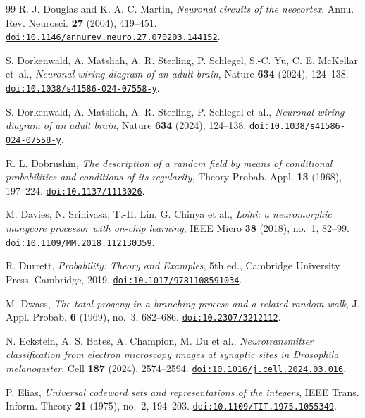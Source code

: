 \begin{thebibliography}{99}
R. J. Douglas and K. A. C. Martin,
\emph{Neuronal circuits of the neocortex},
Annu. Rev. Neurosci. \textbf{27} (2004), 419--451.
\href{https://doi.org/10.1146/annurev.neuro.27.070203.144152}{\nolinkurl{doi:10.1146/annurev.neuro.27.070203.144152}}.

S. Dorkenwald, A. Matsliah, A. R. Sterling, P. Schlegel, S.-C. Yu, C. E. McKellar et~al.,
\emph{Neuronal wiring diagram of an adult brain},
Nature \textbf{634} (2024), 124--138.
\href{https://doi.org/10.1038/s41586-024-07558-y}{\nolinkurl{doi:10.1038/s41586-024-07558-y}}.

S. Dorkenwald, A. Matsliah, A. R. Sterling, P. Schlegel et al.,
\emph{Neuronal wiring diagram of an adult brain},
Nature \textbf{634} (2024), 124--138.
\href{https://doi.org/10.1038/s41586-024-07558-y}{\nolinkurl{doi:10.1038/s41586-024-07558-y}}.

R. L. Dobrushin,
\emph{The description of a random field by means of conditional probabilities and conditions of its regularity},
Theory Probab. Appl. \textbf{13} (1968), 197--224.
\href{https://doi.org/10.1137/1113026}{\nolinkurl{doi:10.1137/1113026}}.

M. Davies, N. Srinivasa, T.-H. Lin, G. Chinya et al.,
\emph{Loihi: a neuromorphic manycore processor with on-chip learning},
IEEE Micro \textbf{38} (2018), no.~1, 82--99.
\href{https://doi.org/10.1109/MM.2018.112130359}{\nolinkurl{doi:10.1109/MM.2018.112130359}}.

R. Durrett,
\emph{Probability: Theory and Examples}, 5th ed.,
Cambridge University Press, Cambridge, 2019.
\href{https://doi.org/10.1017/9781108591034}{\nolinkurl{doi:10.1017/9781108591034}}.

M. Dwass,
\emph{The total progeny in a branching process and a related random walk},
J. Appl. Probab. \textbf{6} (1969), no.~3, 682--686.
\href{https://doi.org/10.2307/3212112}{\nolinkurl{doi:10.2307/3212112}}.

N. Eckstein, A. S. Bates, A. Champion, M. Du et al.,
\emph{Neurotransmitter classification from electron microscopy images at synaptic sites in Drosophila melanogaster},
Cell \textbf{187} (2024), 2574--2594.
\href{https://doi.org/10.1016/j.cell.2024.03.016}{\nolinkurl{doi:10.1016/j.cell.2024.03.016}}.

P. Elias,
\emph{Universal codeword sets and representations of the integers},
IEEE Trans. Inform. Theory \textbf{21} (1975), no.~2, 194--203.
\href{https://doi.org/10.1109/TIT.1975.1055349}{\nolinkurl{doi:10.1109/TIT.1975.1055349}}.


\end{thebibliography}

